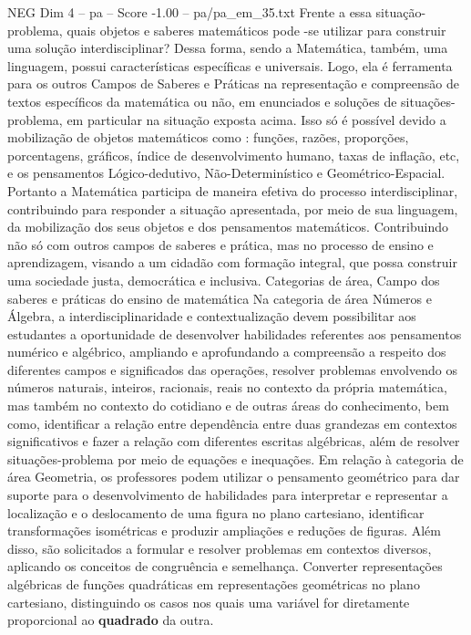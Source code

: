 \begin{textsample}{NEG Dim 4 – pa – Score -1.00 – pa/pa\_em\_35.txt}
Frente a essa situação-problema, quais objetos e saberes matemáticos pode -se utilizar para construir uma solução interdisciplinar?
Dessa forma, sendo a Matemática, também, uma linguagem, possui características específicas e universais.
Logo, ela é ferramenta para os outros Campos de Saberes e Práticas na representação e compreensão de textos específicos da matemática ou não, em enunciados e soluções de situações-problema, em particular na situação exposta acima.
Isso só é possível devido a mobilização de objetos matemáticos como : funções, razões, proporções, porcentagens, gráficos, índice de desenvolvimento humano, taxas de inflação, etc, e os pensamentos Lógico-dedutivo, Não-Determinístico e Geométrico-Espacial.
Portanto a Matemática participa de maneira efetiva do processo interdisciplinar, contribuindo para responder a situação apresentada, por meio de sua linguagem, da mobilização dos seus objetos e dos pensamentos matemáticos.
Contribuindo não só com outros campos de saberes e prática, mas no processo de ensino e aprendizagem, visando a um cidadão com formação integral, que possa construir uma sociedade justa, democrática e inclusiva.
Categorias de área, Campo dos saberes e práticas do ensino de matemática Na categoria de área Números e Álgebra, a interdisciplinaridade e contextualização devem possibilitar aos estudantes a oportunidade de desenvolver habilidades referentes aos pensamentos numérico e algébrico, ampliando e aprofundando a compreensão a respeito dos diferentes campos e significados das operações, resolver problemas envolvendo os números naturais, inteiros, racionais, reais no contexto da própria matemática, mas também no contexto do cotidiano e de outras áreas do conhecimento, bem como, identificar a relação entre dependência entre duas grandezas em contextos significativos e fazer a relação com diferentes escritas algébricas, além de resolver situações-problema por meio de equações e inequações.
Em relação à categoria de área Geometria, os professores podem utilizar o pensamento geométrico para dar suporte para o desenvolvimento de habilidades para interpretar e representar a localização e o deslocamento de uma figura no plano cartesiano, identificar transformações isométricas e produzir ampliações e reduções de figuras.
Além disso, são solicitados a formular e resolver problemas em contextos diversos, aplicando os conceitos de congruência e semelhança.
Converter representações algébricas de funções quadráticas em representações geométricas no plano cartesiano, distinguindo os casos nos quais uma variável for diretamente proporcional ao \textbf{quadrado} da outra.

\end{textsample}

